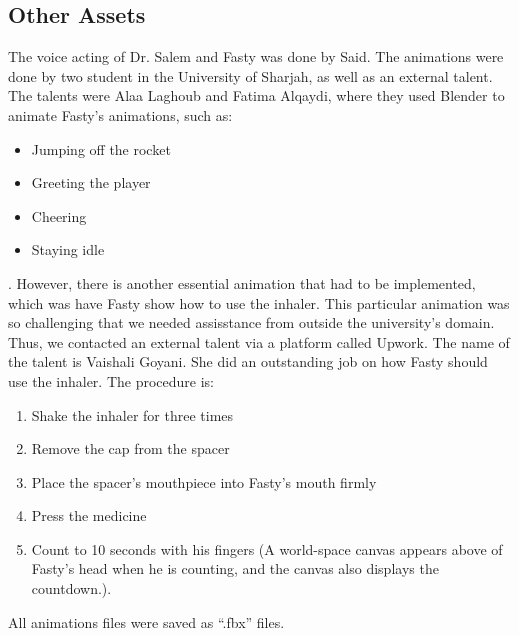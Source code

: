\subsection*{Other Assets}
The voice acting of Dr. Salem and Fasty was done by Said. The animations were done by two student in the University of Sharjah, as well as an external talent. The talents were Alaa Laghoub and Fatima Alqaydi, where they used Blender to animate Fasty's animations, such as:
\begin{itemize}
\item{Jumping off the rocket}
\item{Greeting the player}
\item{Cheering}
\item{Staying idle}
\end{itemize}.
However, there is another essential animation that had to be implemented, which was have Fasty show how to use the inhaler. This particular animation was so challenging that we needed assisstance from outside the university's domain. Thus, we contacted an external talent via a platform called Upwork. The name of the talent is Vaishali Goyani. She did an outstanding job on how Fasty should use the inhaler. The procedure is:
\begin{enumerate}
\item{Shake the inhaler for three times}
\item{Remove the cap from the spacer}
\item{Place the spacer's mouthpiece into Fasty's mouth firmly}
\item{Press the medicine}
\item{Count to 10 seconds with his fingers (A world-space canvas appears above of Fasty's head when he is counting, and the canvas also displays the countdown.)}.
\end{enumerate}
All animations files were saved as “.fbx” files.
